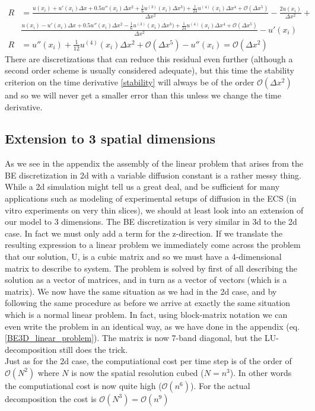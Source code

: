 \begin{align*}
 R &= \frac{u(x_i)+u'(x_i)\Delta x +0.5u''(x_i)\Delta x^2 + \frac{1}{6}u^{(3)}(x_i)\Delta x^3) +\frac{1}{24}u^{(4)}(x_i)\Delta x^4 +\mathcal{O}(\Delta x^5)}{\Delta x^2}-\frac{2u(x_i)}{\Delta x^2}+\\
 &\frac{u(x_i)-u'(x_i)\Delta x +0.5u''(x_i)\Delta x^2 - \frac{1}{6}u^{(3)}(x_i)\Delta x^3) +\frac{1}{24}u^{(4)}(x_i)\Delta x^4 +\mathcal{O}(\Delta x^5)}{\Delta x^2} -u'(x_i)\\
R &= u''(x_i) +\frac{1}{12}u^{(4)}(x_i)\Delta x^2 + \mathcal{O}(\Delta x^5)  -u''(x_i) = \mathcal{O}(\Delta x^2) 
\end{align*}
There are discretizations that can reduce this residual even further (although a second order scheme is usually considered adequate), but this time the stability criterion on the time derivative \ref{stability} will always be of the order $\mathcal{O}(\Delta x^2)$ and so we will never get a smaller error than this unless we change the time derivative.

\subsection{Extension to 3 spatial dimensions}

As we see in the appendix the assembly of the linear problem that arises from the BE discretization in 2d with a variable diffusion constant is a rather messy thing. 
While a 2d simulation might tell us a great deal, and be sufficient for many applications such as modeling of experimental setups of diffusion in the ECS (in vitro experiments on very thin slices), we should at least look into an extension of our model to 3 dimensions. 
The BE discretization is very similar in 3d to the 2d case. In fact we must only add a term for the z-direction. 
If we translate the resulting expression to a linear problem we immediately come across the problem that our solution, U, is a cubic matrix and so we must have a 4-dimensional matrix to describe to system. 
The problem is solved by first of all describing the solution as a vector of matrices, and in turn as a vector of vectors (which is a matrix). 
We now have the same situation as we had in the 2d case, and by following the same procedure as before we arrive at exactly the same situation which is a normal linear problem. 
In fact, using block-matrix notation we can even write the problem in an identical way, as we have done in the appendix (eq. \ref{BE3D_linear_problem}). 
The matrix is now 7-band diagonal, but the LU-decomposition still does the trick.\\
Just as for the 2d case, the computiational cost per time step is of the order of $\mathcal{O}(N^2)$ where $N$ is now the spatial resolution cubed ($N = n^3$). 
In other words the computiational cost is now quite high ($\mathcal{O}(n^6)$).
For the actual decomposition the cost is $\mathcal{O}(N^3) = \mathcal{O}(n^9)$

